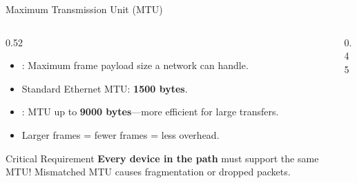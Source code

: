\documentclass[aspectratio=169]{beamer}  %
\begin{document}
\begin{frame}{Maximum Transmission Unit (MTU)}
    \begin{columns}[T]
        \begin{column}{0.52\textwidth}
            \begin{itemize}
                \item {}: Maximum frame payload size a network can handle.
                \item Standard Ethernet MTU: \textbf{1500 bytes}.
                \item {}: MTU up to \textbf{9000 bytes}---more efficient for large transfers.
                \item Larger frames = fewer frames = less overhead.
            \end{itemize}
            
            \vspace{0.3em}
            \begin{alertblock}{Critical Requirement}
                \textbf{Every device in the path} must support the same MTU! Mismatched MTU causes fragmentation or dropped packets.
            \end{alertblock}
        \end{column}
        \begin{column}{0.45\textwidth}
            \begin{center}
            \end{center}
            

\end{column}
\end{columns}
\end{frame}
\end{document}
